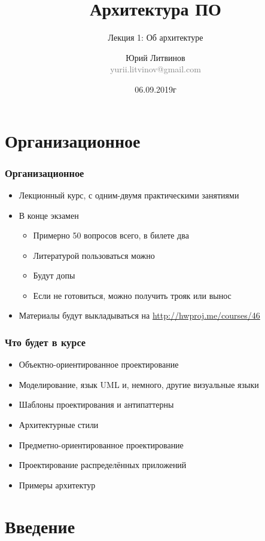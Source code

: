 \documentclass[xetex,mathserif,serif]{beamer}
\title{Архитектура ПО}
\subtitle{Лекция 1: Об архитектуре}
\author[Юрий Литвинов]{Юрий Литвинов\\\small{\textcolor{gray}{yurii.litvinov@gmail.com}}}
\date{06.09.2019г}
\begin{document}
	\frame{\titlepage}

	\section{Организационное}

	\begin{frame}
		\frametitle{Организационное}
		\begin{itemize}
			\item Лекционный курс, с одним-двумя практическими занятиями
			\item В конце экзамен
			\begin{itemize}
				\item Примерно 50 вопросов всего, в билете два
				\item Литературой пользоваться можно
				\item Будут допы
				\item Если не готовиться, можно получить трояк или вынос
			\end{itemize}
			\item Материалы будут выкладываться на \url{http://hwproj.me/courses/46}
		\end{itemize}
	\end{frame}

	\begin{frame}
		\frametitle{Что будет в курсе}
		\begin{itemize}
			\item Объектно-ориентированное проектирование
			\item Моделирование, язык UML и, немного, другие визуальные языки
			\item Шаблоны проектирования и антипаттерны
			\item Архитектурные стили
			\item Предметно-ориентированное проектирование
			\item Проектирование распределённых приложений
			\item Примеры архитектур
		\end{itemize}
	\end{frame}

	\section{Введение}
\end{document}
